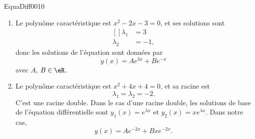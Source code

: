 \begin{corrige}{EquaDiff0010}

\begin{enumerate}

\item
	Le polynôme caractéristique est $x^2-2x-3=0$, et ses solutions sont
	\begin{equation}
		\begin{aligned}[]
			\lambda_1&=3\\
			\lambda_2&=-1,
		\end{aligned}
	\end{equation}
	donc les solutions de l'équation sont données par
	\begin{equation}
		y(x)=A e^{3x}+B e^{-x}
	\end{equation}
	avec $A$, $B\in\eR$.
	
\item
	Le polynôme caractéristique est $x^2+4x+4=0$, et sa racine est
	\begin{equation}
		\lambda_1=\lambda_2=-2.
	\end{equation}
	C'est une racine double. Dans le cas d'une racine double, les solutions \og de base\fg{}  de l'équation différentielle sont $y_1(x)= e^{\lambda x}$ et $y_2(x)=x e^{\lambda x}$. Dans notre cas,
	\begin{equation}
		y(x)=A e^{-2x}+Bx e^{-2x}.
	\end{equation}
	

\end{enumerate}
\end{corrige}
